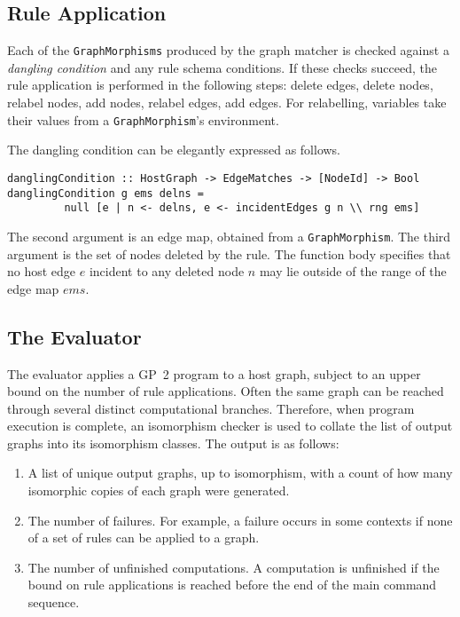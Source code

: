 \subsection{Rule Application}
Each of the \texttt{GraphMorphisms} produced by the graph matcher is checked against a \emph{dangling condition} and any rule schema conditions. If these checks succeed, the rule application is performed in the following steps: delete edges, delete nodes, relabel nodes, add nodes, relabel edges, add edges. For relabelling, variables take their values from a \texttt{GraphMorphism}'s environment. 

The dangling condition can be elegantly expressed as follows.
\begin{verbatim}
danglingCondition :: HostGraph -> EdgeMatches -> [NodeId] -> Bool
danglingCondition g ems delns = 
         null [e | n <- delns, e <- incidentEdges g n \\ rng ems]
\end{verbatim}

The second argument is an edge map, obtained from a \texttt{GraphMorphism}. The third argument is the set of nodes deleted by the rule. The function body specifies that no host edge $e$ incident to any deleted node $n$ may lie outside of the range of the edge map $ems$.

\subsection{The Evaluator}\label{sec:eval}
The evaluator applies a GP~2 program to a host graph, subject to an upper bound on the number of rule applications. Often the same graph can be reached through several distinct computational branches. Therefore, when program execution is complete, an isomorphism checker is used to collate the list of output graphs into its isomorphism classes. The output is as follows:

\begin{enumerate}
\item A list of unique output graphs, up to isomorphism, with a count of how many isomorphic copies of each graph were generated.
\item The number of failures. For example, a failure occurs in some contexts if none of a set of rules can be applied to a graph.
\item The number of unfinished computations. A computation is unfinished if the bound on rule applications is reached before the end of the main command sequence.
\end{enumerate}

